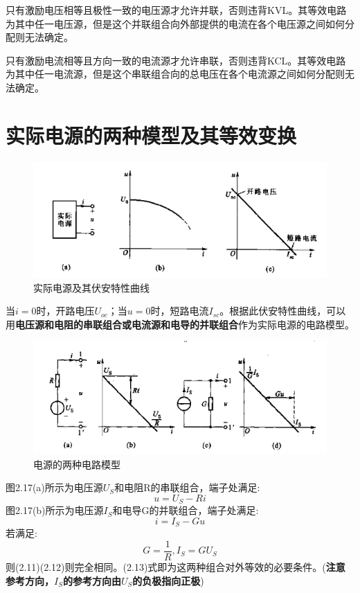 \documentclass[11pt,a4paper,oneside]{book}
\begin{document}
只有激励电压相等且极性一致的电压源才允许并联，否则违背KVL。其等效电路为其中任一电压源，但是这个并联组合向外部提供的电流在各个电压源之间如何分配则无法确定。

只有激励电流相等且方向一致的电流源才允许串联，否则违背KCL。其等效电路为其中任一电流源，但是这个串联组合向的总电压在各个电流源之间如何分配则无法确定。
\section{实际电源的两种模型及其等效变换}
\begin{figure}[H]
	\centering
	\includegraphics[width=0.7\linewidth]{screenshot016}
	\caption{实际电源及其伏安特性曲线}
	\label{fig:screenshot016}
\end{figure}
当$i=0$时，开路电压$U_{oc}$；当$u=0$时，短路电流$I_{sc}$。根据此伏安特性曲线，可以用\textbf{电压源和电阻的串联组合或电流源和电导的并联组合}作为实际电源的电路模型。
\begin{figure}[H]
	\centering
	\includegraphics[width=0.7\linewidth]{screenshot017}
	\caption{电源的两种电路模型}
	\label{fig:screenshot017}
\end{figure}
\noindent 图2.17(a)所示为电压源$U_S$和电阻R的串联组合，端子处满足:
\begin{equation}
	u=U_S-Ri
\end{equation}
图2.17(b)所示为电压源$I_S$和电导G的并联组合，端子处满足:
\begin{equation}
	i=I_S-Gu
\end{equation}
若满足:
\begin{equation}
	G=\frac{1}{R},I_S=GU_S
\end{equation}
则(2.11)(2.12)则完全相同。(2.13)式即为这两种组合对外等效的必要条件。(\textbf{注意参考方向，$I_S$的参考方向由$U_S$的负极指向正极})
\end{document}
